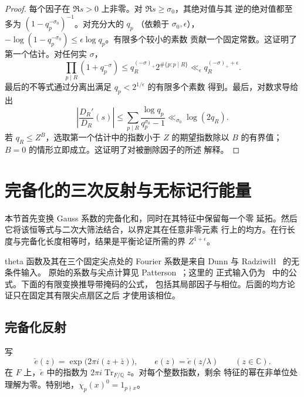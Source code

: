 \begin{proof}
每个因子在 $\Re s>0$ 上非零。对 $\Re s\ge\sigma_0$，其绝对值与其
逆的绝对值都至多为 $(1-q_p^{-\sigma_0})^{-1}$。对充分大的 $q_p$
（依赖于 $\sigma_0,\epsilon$），
$-\log(1-q_p^{-\sigma_0})\le\epsilon\log q_p$。有限多个较小的素数
贡献一个固定常数。这证明了第一个估计。对任何实 $\sigma$，
\[
 \prod_{p\mid R}(1+q_p^{-\sigma})
 \le q_R^{(-\sigma)_+}2^{\#\{p:p\mid R\}}
 \ll_\epsilon q_R^{(-\sigma)_++\epsilon}.
\]
最后的不等式通过分离出满足 $q_p<2^{1/\epsilon}$ 的有限多个素数
得到。最后，对数求导给出
\[
 \left|\frac{D_R'}{D_R}(s)\right|
 \le\sum_{p\mid R}\frac{\log q_p}{q_p^{\sigma_0}-1}
 \ll_{\sigma_0}\log(2q_R).
\]
若 $q_R\le Z^B$，选取第一个估计中的指数小于 $Z$ 的期望指数除以
$B$ 的有界值；$B=0$ 的情形立即成立。这证明了对被删除因子的所述
解释。
\end{proof}

\section{完备化的三次反射与无标记行能量}
\label{sec:completed-reflection}

本节首先变换 Gauss 系数的完备化和，同时在其特征中保留每一个零
延拓。然后它将该恒等式与二次大筛法结合，以界定其在任意非零元素
行上的均方。在行长度与完备化长度相等时，结果是平衡论证所需的界
$Z^{1+\epsilon}$。

theta 函数及其在三个固定尖点处的 Fourier 系数是来自 Dunn 与
Radziwi{\l}{\l}~\cite[第~5 节与附录~A]{DR} 的无条件输入。
原始的系数与尖点计算见
Patterson~\cite[定理~8.1 与第~7--8 节]{Patterson}；这里的
正式输入仍为~\cite{DR} 中的公式。下面的有限变换推导带掩码的公式，
包括其局部因子与相位。后面的均方论证只在固定其有限尖点扇区之后
才使用该相位。

\subsection{完备化反射}

写
\[
 \check e(z)=\exp\bigl(2\pi i(z+\bar z)\bigr),
 \qquad e(z)=\check e(z/\lambda)\qquad(z\in\mathbb C).
\]
在 $F$ 上，$\check e$ 中的指数为
$2\pi i\operatorname{Tr}_{F/\mathbb Q}z$。对每个整数指数，剩余
特征的幂在非单位处理解为零。特别地，$\chi_p(x)^0=1_{p\nmid x}$。


